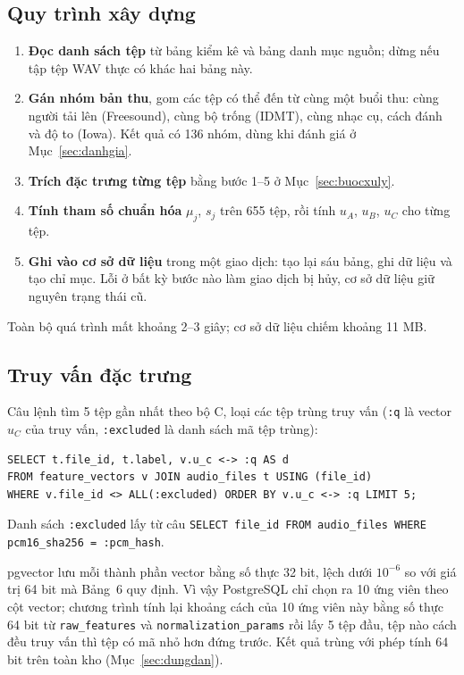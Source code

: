 \documentclass[11pt,a4paper]{article}
\begin{document}
\subsection{Quy trình xây dựng}\label{sec:quytrinhxd}
\begin{enumerate}
\item \textbf{Đọc danh sách tệp} từ bảng kiểm kê và bảng danh mục nguồn; dừng nếu tập tệp WAV thực có khác hai bảng này.
\item \textbf{Gán nhóm bản thu}, gom các tệp có thể đến từ cùng một buổi thu: cùng người tải lên (Freesound), cùng bộ trống (IDMT), cùng nhạc cụ, cách đánh và độ to (Iowa). Kết quả có 136 nhóm, dùng khi đánh giá ở Mục~\ref{sec:danhgia}.
\item \textbf{Trích đặc trưng từng tệp} bằng bước 1--5 ở Mục~\ref{sec:buocxuly}.
\item \textbf{Tính tham số chuẩn hóa} $\mu_j$, $s_j$ trên 655 tệp, rồi tính $u_A$, $u_B$, $u_C$ cho từng tệp.
\item \textbf{Ghi vào cơ sở dữ liệu} trong một giao dịch: tạo lại sáu bảng, ghi dữ liệu và tạo chỉ mục. Lỗi ở bất kỳ bước nào làm giao dịch bị hủy, cơ sở dữ liệu giữ nguyên trạng thái cũ.
\end{enumerate}
Toàn bộ quá trình mất khoảng 2--3 giây; cơ sở dữ liệu chiếm khoảng 11 MB.

\subsection{Truy vấn đặc trưng}
Câu lệnh tìm 5 tệp gần nhất theo bộ C, loại các tệp trùng truy vấn (\texttt{:q} là vector $u_C$ của truy vấn, \texttt{:excluded} là danh sách mã tệp trùng):
\begin{verbatim}
SELECT t.file_id, t.label, v.u_c <-> :q AS d
FROM feature_vectors v JOIN audio_files t USING (file_id)
WHERE v.file_id <> ALL(:excluded) ORDER BY v.u_c <-> :q LIMIT 5;
\end{verbatim}
Danh sách \texttt{:excluded} lấy từ câu \texttt{SELECT file\_id FROM audio\_files WHERE pcm16\_sha256 = :pcm\_hash}.

pgvector lưu mỗi thành phần vector bằng số thực 32 bit, lệch dưới $10^{-6}$ so với giá trị 64 bit mà Bảng~6 quy định. Vì vậy PostgreSQL chỉ chọn ra 10 ứng viên theo cột vector; chương trình tính lại khoảng cách của 10 ứng viên này bằng số thực 64 bit từ \texttt{raw\_features} và \texttt{normalization\_params} rồi lấy 5 tệp đầu, tệp nào cách đều truy vấn thì tệp có mã nhỏ hơn đứng trước. Kết quả trùng với phép tính 64 bit trên toàn kho (Mục~\ref{sec:dungdan}).
\clearpage
\end{document}
